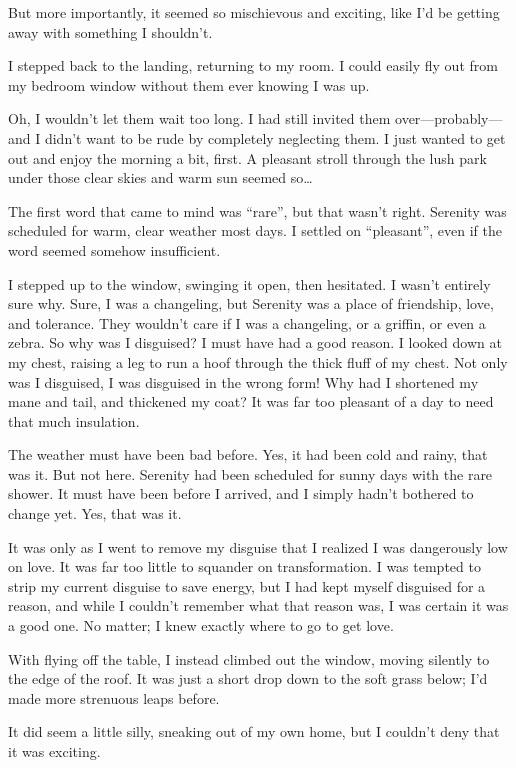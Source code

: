 But more importantly, it seemed so mischievous and exciting, like I’d be getting away with something I shouldn’t.

I stepped back to the landing, returning to my room. I could easily fly out from my bedroom window without them ever knowing I was up.

Oh, I wouldn’t let them wait too long. I had still invited them over—probably—and I didn’t want to be rude by completely neglecting them. I just wanted to get out and enjoy the morning a bit, first. A pleasant stroll through the lush park under those clear skies and warm sun seemed so…

The first word that came to mind was “rare”, but that wasn’t right. Serenity was scheduled for warm, clear weather most days. I settled on “pleasant”, even if the word seemed somehow insufficient.

I stepped up to the window, swinging it open, then hesitated. I wasn’t entirely sure why. Sure, I was a changeling, but Serenity was a place of friendship, love, and tolerance. They wouldn’t care if I was a changeling, or a griffin, or even a zebra. So why was I disguised? I must have had a good reason. I looked down at my chest, raising a leg to run a hoof through the thick fluff of my chest. Not only was I disguised, I was disguised in the wrong form! Why had I shortened my mane and tail, and thickened my coat? It was far too pleasant of a day to need that much insulation.

The weather must have been bad before. Yes, it had been cold and rainy, that was it. But not here. Serenity had been scheduled for sunny days with the rare shower. It must have been before I arrived, and I simply hadn’t bothered to change yet. Yes, that was it.

It was only as I went to remove my disguise that I realized I was dangerously low on love. It was far too little to squander on transformation. I was tempted to strip my current disguise to save energy, but I had kept myself disguised for a reason, and while I couldn’t remember what that reason was, I was certain it was a good one. No matter; I knew exactly where to go to get love.

With flying off the table, I instead climbed out the window, moving silently to the edge of the roof. It was just a short drop down to the soft grass below; I’d made more strenuous leaps before.

It did seem a little silly, sneaking out of my own home, but I couldn’t deny that it was exciting.


